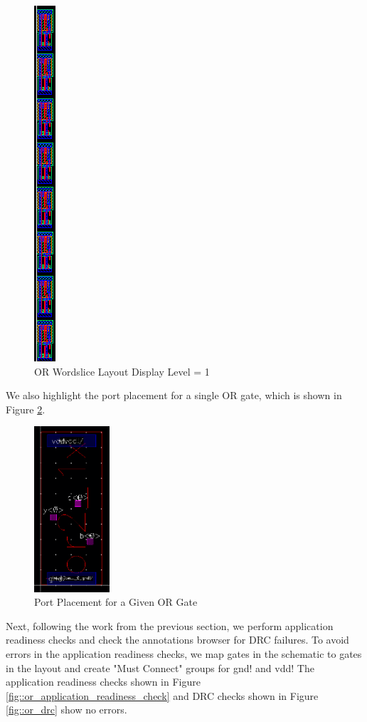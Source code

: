 \documentclass{article}
\begin{document}
	\begin{figure}[H]
		\centerline{\includegraphics[height=0.8\textwidth, angle=270]{or2_1x_8_layout_detailed.png}}
		\caption{OR Wordslice Layout Display Level = 1}
		\label{fig::or2_1x_8_layout_detailed}
	\end{figure}
	
	\noindent We also highlight the port placement for a single OR gate, which is shown in Figure \ref{fig::or2_1x_8_single_gate_ports}.
	
	\begin{figure}[H]
		\centerline{\includegraphics[width=0.25\textwidth]{or2_1x_8_single_gate_ports.png}}
		\caption{Port Placement for a Given OR Gate}
		\label{fig::or2_1x_8_single_gate_ports}
	\end{figure}
	
	\noindent Next, following the work from the previous section, we perform application readiness checks and check the annotations browser for DRC failures. To avoid errors in the application readiness checks, we map gates in the schematic to gates in the layout and create "Must Connect" groups for gnd! and vdd! The application readiness checks shown in Figure \ref{fig::or_application_readiness_check} and DRC checks shown in Figure \ref{fig::or_drc} show no errors.
	
\end{document}
